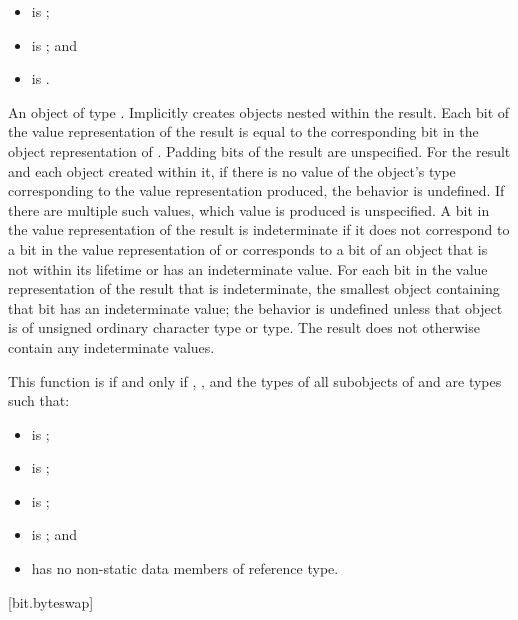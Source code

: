 \begin{itemdescr}
\pnum
\constraints
\begin{itemize}
\item {} is ;
\item {} is ; and
\item {} is .
\end{itemize}

\pnum
\returns
An object of type .
Implicitly creates objects nested within the result.
Each bit of the value representation of the result
is equal to the corresponding bit in the object representation
of . Padding bits of the result are unspecified.
For the result and each object created within it,
if there is no value of the object's type corresponding to the
value representation produced, the behavior is undefined.
If there are multiple such values, which value is produced is unspecified.
A bit in the value representation of the result is indeterminate if
it does not correspond to a bit in the value representation of  or
corresponds to a bit of an object that is not within its lifetime or
has an indeterminate value.
For each bit in the value representation of the result that is indeterminate,
the smallest object containing that bit has an indeterminate value;
the behavior is undefined unless that object is
of unsigned ordinary character type or  type.
The result does not otherwise contain any indeterminate values.

\pnum
\remarks
This function is  if and only if
, , and the types of all subobjects
of  and  are types  such that:
\begin{itemize}
\item {} is ;
\item {} is ;
\item {} is ;
\item {} is ; and
\item {} has no non-static data members of reference type.
\end{itemize}
\end{itemdescr}

[bit.byteswap]{}

